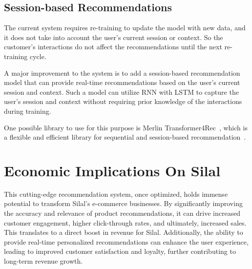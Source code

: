 \subsection{Session-based Recommendations}

The current system requires re-training to update the model with new data, and it does not take into account the user's current session or context.
So the customer's interactions do not affect the recommendations until the next re-training cycle.

A major improvement to the system is to add a session-based recommendation model that can provide real-time recommendations based on the user's current session and context.
Such a model can utilize RNN with LSTM to capture the user's session and context without requiring prior knowledge of the interactions during training. 

One possible library to use for this purpose is Merlin Transformer4Rec~\cite{NvidiaMerlinTransformers4Rec}, 
which is a flexible and efficient library for sequential and session-based recommendation~\cite{NvidiaMerlinTransformers4Rec}.


\section{Economic Implications On Silal}

This cutting-edge recommendation system, once optimized, holds immense potential to transform Silal's e-commerce businesses.
 By significantly improving the accuracy and relevance of product recommendations, it can drive increased customer engagement, higher click-through rates, and ultimately, increased sales. This translates to a direct boost in revenue for Silal. Additionally, the ability to provide real-time personalized recommendations can enhance the user experience, leading to improved customer satisfaction and loyalty, further contributing to long-term revenue growth. 


